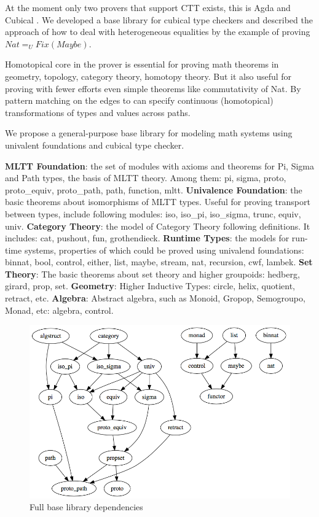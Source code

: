 \documentclass{article}
\begin{document}
At the moment only two provers that support CTT exists, this is Agda \cite{Ulf09} and Cubical \cite{Mortberg17}.
We developed a base library for cubical type checkers and described the approach
of how to deal with heterogeneous equalities by the example of proving $Nat =_U Fix(Maybe)$.

Homotopical core in the prover is essential for proving math theorems in geometry,
topology, category theory, homotopy theory. But it also useful
for proving with fewer efforts even simple theorems like commutativity of Nat. By pattern matching
on the edges to can specify continuous (homotopical) transformations of types
and values across paths.

We propose a general-purpose base library for modeling math systems using univalent foundations
and cubical type checker.

{\bf MLTT Foundation}:       the set of modules with axioms and theorems for Pi, Sigma and Path types,
                             the basis of MLTT theory. Among them: pi, sigma, proto, proto\_equiv,
                             proto\_path, path, function, mltt.
{\bf Univalence Foundation}: the basic theorems about isomorphisms of MLTT types. Useful for
                             proving transport between types, include following modules:
                             iso, iso\_pi, iso\_sigma, trunc, equiv, univ.
{\bf Category Theory}:       the model of Category Theory following \cite{HoTT} definitions. It includes:
                             cat, pushout, fun, grothendieck.
{\bf Runtime Types}:         the models for run-time systems, properties of which could be proved using
                             univalend foundations: binnat, bool, control, either, list,
                             maybe, stream, nat, recursion, cwf, lambek.
{\bf Set Theory}:            The basic theorems about set theory and higher groupoids: hedberg, girard, prop, set.
{\bf Geometry}:              Higher Inductive Types: circle, helix, quotient, retract, etc.
{\bf Algebra}:               Abstract algebra, such as Monoid, Gropop, Semogroupo, Monad,
                             etc: algebra, control.

\begin{figure}[h]
  \centerline{\includegraphics[scale=0.36]{baselib}}
  \caption{Full base library dependencies}
\end{figure}
\end{document}
